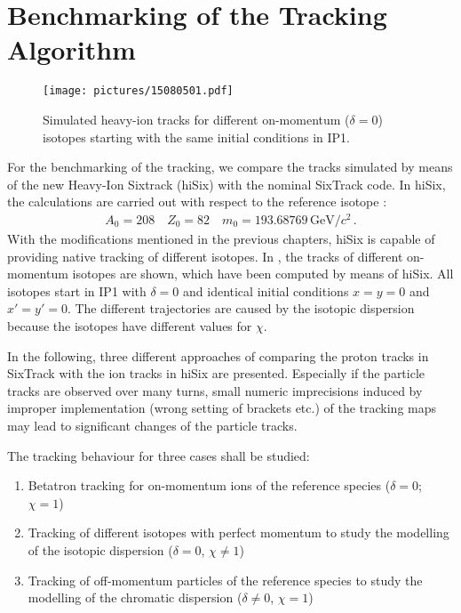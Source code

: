 \section{Benchmarking of the Tracking Algorithm}
  \begin{figure}[b]
  \centering
  \texttt{[image: pictures/15080501.pdf]}
  \caption{Simulated heavy-ion tracks for different on-momentum ($\delta=0$) isotopes starting with the same initial conditions in IP1.}  
  \label{pic:15080501}
  \end{figure}
For the benchmarking of the tracking, we compare the tracks simulated by means of the new Heavy-Ion Sixtrack (hiSix) with the nominal SixTrack code. In hiSix, the calculations are carried out with respect to the reference isotope \lead:
\begin{align}
A_0=208 \quad Z_0=82 \quad m_0=193.68769\,\text{GeV}/c^2 \, .
\end{align}
With the modifications mentioned in the previous chapters, hiSix is capable of providing native tracking of different isotopes. In , the tracks of different on-momentum isotopes are shown, which have been computed by means of hiSix. All isotopes start in IP1 with $\delta=0$ and identical initial conditions $x=y=0$ and $x'=y'=0$. The different trajectories are caused by the isotopic dispersion because the isotopes have different values for $\chi$. 

In the following, three different approaches of comparing the proton tracks in SixTrack with the ion tracks in hiSix are presented. Especially if the particle tracks are observed over many turns, small numeric imprecisions induced by improper implementation (wrong setting of brackets etc.) of the tracking maps may lead to significant changes of the particle tracks. 

The tracking behaviour for three cases shall be studied:
\begin{enumerate}
\item Betatron tracking for on-momentum ions of the reference species ($\delta = 0$; $\chi=1$)
\item Tracking of different isotopes with perfect momentum to study the modelling of the isotopic dispersion ($\delta =0$, $\chi \neq 1$)
\item Tracking of off-momentum particles of the reference species to study the modelling of the chromatic dispersion ($\delta \neq 0$, $\chi =1$)  
\end{enumerate}


